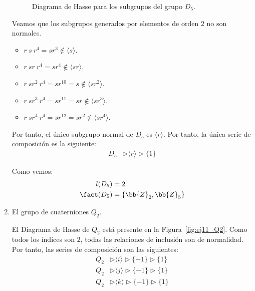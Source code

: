 \begin{ejercicio}
\begin{enumerate}
\begin{figure}
            \caption{Diagrama de Hasse para los subgrupos del grupo $D_5$.}
            \label{fig:Hasse_D5}
        \end{figure}     
        
        Veamos que los subgrupos generados por elementos de orden $2$ no son normales.
        \begin{itemize}
            \item $r\ s\ r^4 = sr^3 \notin \langle s \rangle$.
            \item $r\ sr \ r^4 = sr^4 \notin \langle sr \rangle$.
            \item $r\ sr^2 \ r^4 = sr^{10} = s \notin \langle sr^2 \rangle$.
            \item $r\ sr^3 \ r^4 = sr^{11} = sr \notin \langle sr^3 \rangle$.
            \item $r\ sr^4 \ r^4 = sr^{12} = sr^2 \notin \langle sr^4 \rangle$.
        \end{itemize}

        Por tanto, el único subgrupo normal de $D_5$ es $\langle r\rangle$. Por tanto, la única serie de composición es la siguiente:
        \begin{align*}
            D_5 &\rhd \langle r \rangle \rhd \{1\}
        \end{align*}

        Como vemos:
        \begin{align*}
            l(D_5) &= 2 \\
            \fact(D_5) &= \{\bb{Z}_2, \bb{Z}_5\}
        \end{align*}
        \item El grupo de cuaterniones $Q_2$.
        
        El Diagrama de Hasse de $Q_2$ está presente en la Figura~\ref{fig:ej11_Q2}. Como todos los índices son $2$, todas las relaciones de inclusión son de normalidad. Por tanto, las series de composición son las siguientes:
        \begin{align*}
            Q_2 &\rhd \langle i \rangle \rhd \{-1\} \rhd \{1\} \\
            Q_2 &\rhd \langle j \rangle \rhd \{-1\} \rhd \{1\} \\
            Q_2 &\rhd \langle k \rangle \rhd \{-1\} \rhd \{1\}
        \end{align*}


\end{enumerate}
\end{ejercicio}
